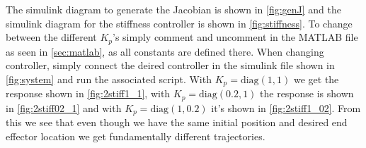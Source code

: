 \documentclass[a4paper]{scrartcl}
\begin{document}
The simulink diagram to generate the Jacobian is shown in \autoref{fig:genJ} and the simulink diagram for the stiffness controller is shown in \autoref{fig:stiffness}. To change between the different $K_p$'s simply comment and uncomment in the MATLAB file as seen in \autoref{sec:matlab},  as all constants are defined there. When changing controller, simply connect the deired controller in the simulink file shown in \autoref{fig:system} and run the associated script. With $K_p = \text{diag}(1,1)$ we get the response shown in \autoref{fig:2stiff1_1}, with $K_p = \text{diag}(0.2,1)$ the response is shown in \autoref{fig:2stiff02_1} and with $K_p = \text{diag}(1,0.2)$ it's shown in \autoref{fig:2stiff1_02}. From this we see that even though we have the same initial position and desired end effector location we get fundamentally different trajectories. 
\end{document}
